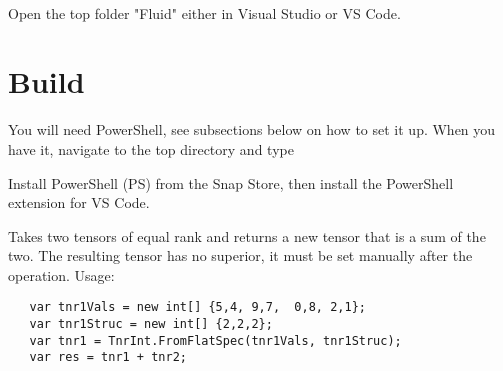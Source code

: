 

\cfoot{\thepage}								      %
\renewcommand{\headrulewidth}{0.0cm}			%
\renewcommand{\footrulewidth}{0.0cm}			%
\lstset{language=bash,basicstyle=\small\sffamily}



\begin{center}
   \textbf{\LARGE{}}\\[0.25cm]
\end{center}

Open the top folder "Fluid" either in Visual Studio or VS Code.

\section{Build}
You will need PowerShell, see subsections below on how to set it up. When you have it, navigate to the top directory and type

Install PowerShell (PS) from the Snap Store, then install the PowerShell extension for VS Code.

Takes two tensors of equal rank and returns a new tensor that is a sum of the two. The resulting tensor has no superior, it must be set manually after the operation. Usage:
\begin{lstlisting}
   var tnr1Vals = new int[] {5,4, 9,7,  0,8, 2,1};
   var tnr1Struc = new int[] {2,2,2};
   var tnr1 = TnrInt.FromFlatSpec(tnr1Vals, tnr1Struc);
   var res = tnr1 + tnr2;
\end{lstlisting}

